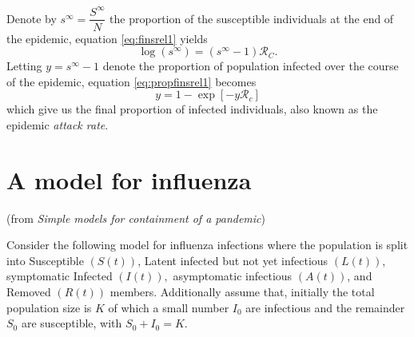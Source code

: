 \documentclass{book}
\begin{document}
Denote by $s^\infty=\dfrac{S^\infty}{N}$ the proportion of the susceptible individuals at the end of the epidemic, equation \eqref{eq:finsrel1} yields
%
\begin{equation} \label{eq:propfinsrel1}
\log(s^\infty)=(s^\infty-1)\mathcal{R}_C.
\end{equation}
%
Letting $y=s^\infty-1$ denote the proportion of population infected over the course of the epidemic, equation \eqref{eq:propfinsrel1} becomes
\begin{equation} \label{eq:finalsize}
y=1-\exp[-y\mathcal{R}_c]
\end{equation}
which give us the final proportion of infected individuals, also known as the epidemic {\it attack rate}.

\section*{A model for influenza }
(from {\it Simple models for containment of a pandemic})

Consider the following model for influenza infections where the population is split into Susceptible $(S(t))$, Latent infected but not yet infectious $(L(t))$, symptomatic Infected $(I(t)),$ asymptomatic infectious $(A(t))$, and Removed $(R(t))$ members. 
Additionally assume that, initially the total population size is $K$ of which a small number $I_{0}$ are infectious and the remainder $S_{0}$ are susceptible, with $S_{0}+I_{0}=K .$
\end{document}
